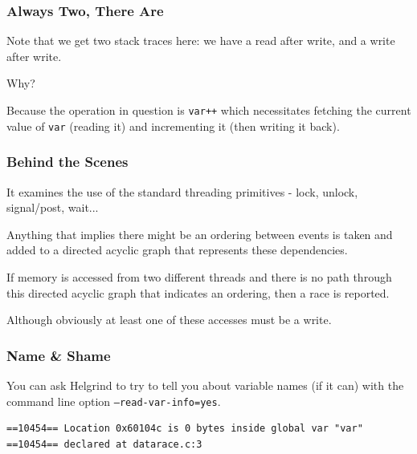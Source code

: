 \begin{frame}
	\frametitle{Always Two, There Are}


	Note that we get two stack traces here: we have a read after write, and a write after write.

	Why?

	Because the operation in question is \texttt{var++} which necessitates fetching the current value of \texttt{var} (reading it) and incrementing it (then writing it back).

\end{frame}

\begin{frame}
	\frametitle{Behind the Scenes}

	It examines the use of the standard threading primitives - lock, unlock, signal/post, wait...

	Anything that implies there might be an ordering between events is taken and added to a directed acyclic graph that represents these dependencies.

	If memory is accessed from two different threads and there is no path through this directed acyclic graph that indicates an ordering, then a race is reported.

	Although obviously at least one of these accesses must be a write.

\end{frame}

\begin{frame}[fragile]
	\frametitle{Name \& Shame}

	You can ask Helgrind to try to tell you about variable names (if it can) with the command line option \texttt{--read-var-info=yes}.

	\begin{verbatim}
==10454== Location 0x60104c is 0 bytes inside global var "var"
==10454== declared at datarace.c:3
\end{verbatim}

\end{frame}

